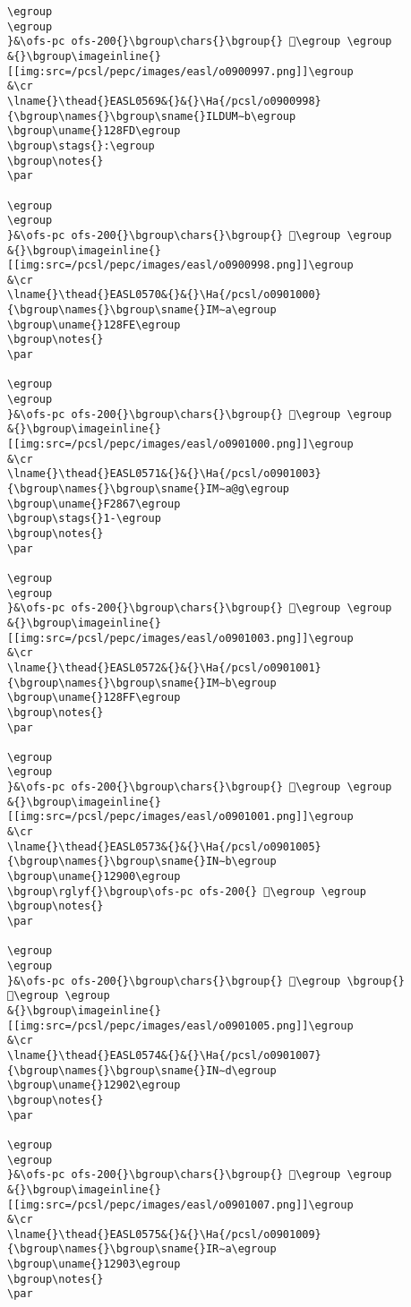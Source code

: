 \begin{verbatim}
\egroup
\egroup
}&\ofs-pc ofs-200{}\bgroup\chars{}\bgroup{} 𒣼\egroup \egroup
&{}\bgroup\imageinline{}[[img:src=/pcsl/pepc/images/easl/o0900997.png]]\egroup
&\cr
\lname{}\thead{}EASL0569&{}&{}\Ha{/pcsl/o0900998}{\bgroup\names{}\bgroup\sname{}ILDUM∼b\egroup
\bgroup\uname{}128FD\egroup
\bgroup\stags{}:\egroup
\bgroup\notes{}
\par 

\egroup
\egroup
}&\ofs-pc ofs-200{}\bgroup\chars{}\bgroup{} 𒣽\egroup \egroup
&{}\bgroup\imageinline{}[[img:src=/pcsl/pepc/images/easl/o0900998.png]]\egroup
&\cr
\lname{}\thead{}EASL0570&{}&{}\Ha{/pcsl/o0901000}{\bgroup\names{}\bgroup\sname{}IM∼a\egroup
\bgroup\uname{}128FE\egroup
\bgroup\notes{}
\par 

\egroup
\egroup
}&\ofs-pc ofs-200{}\bgroup\chars{}\bgroup{} 𒣾\egroup \egroup
&{}\bgroup\imageinline{}[[img:src=/pcsl/pepc/images/easl/o0901000.png]]\egroup
&\cr
\lname{}\thead{}EASL0571&{}&{}\Ha{/pcsl/o0901003}{\bgroup\names{}\bgroup\sname{}IM∼a@g\egroup
\bgroup\uname{}F2867\egroup
\bgroup\stags{}1-\egroup
\bgroup\notes{}
\par 

\egroup
\egroup
}&\ofs-pc ofs-200{}\bgroup\chars{}\bgroup{} 󲡧\egroup \egroup
&{}\bgroup\imageinline{}[[img:src=/pcsl/pepc/images/easl/o0901003.png]]\egroup
&\cr
\lname{}\thead{}EASL0572&{}&{}\Ha{/pcsl/o0901001}{\bgroup\names{}\bgroup\sname{}IM∼b\egroup
\bgroup\uname{}128FF\egroup
\bgroup\notes{}
\par 

\egroup
\egroup
}&\ofs-pc ofs-200{}\bgroup\chars{}\bgroup{} 𒣿\egroup \egroup
&{}\bgroup\imageinline{}[[img:src=/pcsl/pepc/images/easl/o0901001.png]]\egroup
&\cr
\lname{}\thead{}EASL0573&{}&{}\Ha{/pcsl/o0901005}{\bgroup\names{}\bgroup\sname{}IN∼b\egroup
\bgroup\uname{}12900\egroup
\bgroup\rglyf{}\bgroup\ofs-pc ofs-200{} 𒤀\egroup \egroup
\bgroup\notes{}
\par 

\egroup
\egroup
}&\ofs-pc ofs-200{}\bgroup\chars{}\bgroup{} 𒤀\egroup \bgroup{} 𒤁\egroup \egroup
&{}\bgroup\imageinline{}[[img:src=/pcsl/pepc/images/easl/o0901005.png]]\egroup
&\cr
\lname{}\thead{}EASL0574&{}&{}\Ha{/pcsl/o0901007}{\bgroup\names{}\bgroup\sname{}IN∼d\egroup
\bgroup\uname{}12902\egroup
\bgroup\notes{}
\par 

\egroup
\egroup
}&\ofs-pc ofs-200{}\bgroup\chars{}\bgroup{} 𒤂\egroup \egroup
&{}\bgroup\imageinline{}[[img:src=/pcsl/pepc/images/easl/o0901007.png]]\egroup
&\cr
\lname{}\thead{}EASL0575&{}&{}\Ha{/pcsl/o0901009}{\bgroup\names{}\bgroup\sname{}IR∼a\egroup
\bgroup\uname{}12903\egroup
\bgroup\notes{}
\par 


\end{verbatim}
